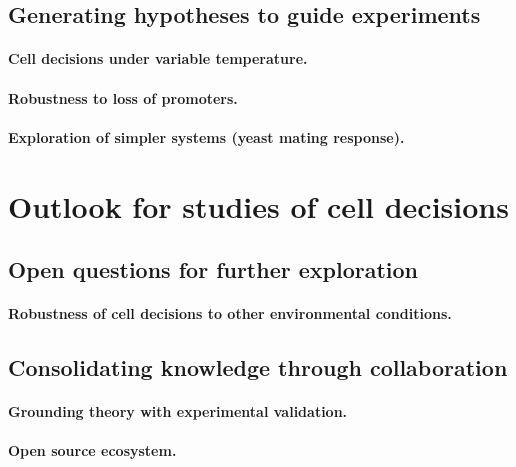 	\subsection{Generating hypotheses to guide experiments}
		\paragraph{Cell decisions under variable temperature.}		
		\paragraph{Robustness to loss of promoters.}
		\paragraph{Exploration of simpler systems (yeast mating response).}
		
\section{Outlook for studies of cell decisions}

	\subsection{Open questions for further exploration}
		\paragraph{Robustness of cell decisions to other environmental conditions.}	
					
	\subsection{Consolidating knowledge through collaboration}
	
		\paragraph{Grounding theory with experimental validation.}		
		\paragraph{Open source ecosystem.}


















